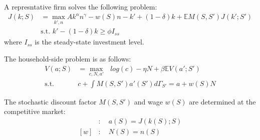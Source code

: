 A represntative firm solves the following problem:
\begin{align*}
  J(k;S) &= \max_{k',n} Ak^{\alpha}n^{\gamma} -w(S)n -k' + (1-\delta)k + \mathbb{E}M(S,S')J(k';S')
  \\
  &\text{s.t. } k' - (1-\delta)k \geq \phi I_{ss}
\end{align*}
where $I_{ss}$ is the steady-state investment level.

The household-side problem is as follows:
\begin{align*}
  V(a;S) &= \max_{c,N,a'}\text{ } log(c) - \eta N + \beta \mathbb{E}V(a';S')
  \\
  \text{s.t.}\quad& c + \int M(S,S') a'(S') d\Gamma_{S'} =  a + w(S)N
\end{align*}

The stochastic discount factor $M(S,S')$ and wage $w(S)$ are determined at the competitive market:
\begin{align*}
  [M]&:\quad a(S) = J(k(S);S)
  \\
  [w]&:\quad N(S) = n(S)
\end{align*}

